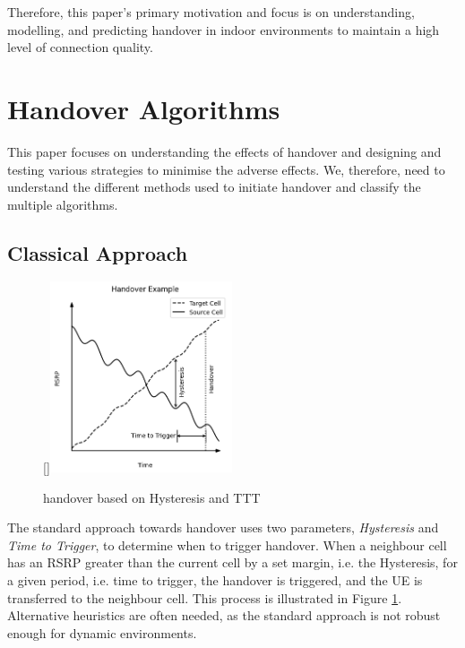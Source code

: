 Therefore, this paper's primary motivation and focus is on understanding, modelling, and predicting handover in indoor environments to maintain a high level of connection quality.

\section{Handover Algorithms}
\label{sec:algorithms}
This paper focuses on understanding the effects of handover and designing and testing various strategies to minimise the adverse effects. We, therefore, need to understand the different methods used to initiate handover and classify the multiple algorithms.

\subsection{Classical Approach}

\begin{figure}
     \raisebox{0pt}[\dimexpr{}\baselineskip\relax]{\includegraphics[width=0.48\textwidth]{src/img/hysteresis_ttt.png}}
    \caption{handover based on Hysteresis and TTT}
    \label{fig:hysteresis_handover}
\end{figure}

The standard approach towards handover uses two parameters, \textit{Hysteresis} and \textit{Time to Trigger}, to determine when to trigger handover. When a neighbour cell has an RSRP greater than the current cell by a set margin, i.e. the Hysteresis, for a given period, i.e. time to trigger, the handover is triggered, and the UE is transferred to the neighbour cell. This process is illustrated in Figure \ref{fig:hysteresis_handover}. Alternative heuristics are often needed, as the standard approach is not robust enough for dynamic environments.



